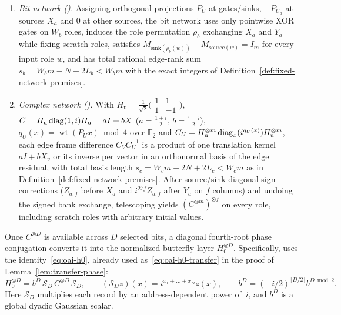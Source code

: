 \begin{proposition}\label{oai:networks}\label{oai:prop8}
\begin{enumerate}[label=(\alph*),leftmargin=*]
\item \emph{Bit network (\cite[Prop.~7]{OAI26}).} Assigning orthogonal projections $P_U$ at gates/sinks, $-P_{U_a}$ at
  sources $X_a$ and $0$ at other sources, the bit network uses only pointwise XOR gates on $W_b$ roles, induces the role
  permutation $\rho_b$ exchanging $X_a$ and $Y_a$ while fixing scratch roles, satisfies
  $M_{\mathrm{sink}(\rho_b(w))}-M_{\mathrm{source}(w)}=I_m$ for every input role $w$, and has total rational edge-rank
  sum $s_b=W_bm-N+2L_b<W_bm$ with the exact integers of Definition~\ref{def:fixed-network-premises}.
\item \emph{Complex network (\cite[Prop.~8]{OAI26}).} With $H_{\mathrm u}=\frac1{\sqrt2}\bigl(\begin{smallmatrix}1&1\\1&-1\end{smallmatrix}\bigr)$,
  $C=H_{\mathrm u}\operatorname{diag}(1,i)H_{\mathrm u}=aI+bX$ ($a=\frac{1+i}2$, $b=\frac{1-i}2$), $q_U(x)=\operatorname{wt}(P_Ux)\bmod4$
  over $\mathbb F_2$ and $C_U=H_{\mathrm u}^{\otimes m}\operatorname{diag}_x(i^{q_U(x)})H_{\mathrm u}^{\otimes m}$, each edge frame
  difference $C_VC_U^{-1}$ is a product of one translation kernel $aI+bX_v$ or its inverse per vector in an orthonormal
  basis of the edge residual, with total basis length $s_c=W_cm-2N+2L_c<W_cm$ as in
  Definition~\ref{def:fixed-network-premises}. After source/sink diagonal sign corrections ($Z_{a,f}$ before $X_a$ and
  $i^{27f}Z_{a,f}$ after $Y_a$ on $f$ columns) and undoing the signed bank exchange, telescoping yields
  $(C^{\otimes m})^{\otimes f}$ on every role, including scratch roles with arbitrary initial values.
\end{enumerate}
\end{proposition}

Once $C^{\otimes D}$ is available across $D$ selected bits, a diagonal fourth-root phase conjugation converts it into the normalized butterfly layer $H_0^{\otimes D}$. Specifically, \cite[(18), \S5.1]{OAI26} uses the identity~\eqref{eq:oai-h0}, already used as~\eqref{eq:oai-h0-transfer} in the proof of Lemma~\ref{lem:transfer-phase}:
\begin{equation}\label{eq:oai-h0}
  H_0^{\otimes D}=b^D\,\mathcal S_D\,C^{\otimes D}\,\mathcal S_D,\qquad
  (\mathcal S_Dz)(x)=i^{x_1+\dots+x_D}z(x),\qquad b^D=(-i/2)^{\lfloor D/2\rfloor}b^{D\bmod2}.
\end{equation}
Here $\mathcal S_D$ multiplies each record by an address-dependent power of~$i$, and $b^D$ is a global dyadic Gaussian scalar.


